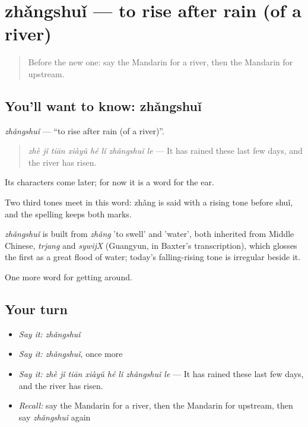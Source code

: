 \section[zhǎngshuǐ]{zhǎngshuǐ — to rise after rain (of a river)}

\label{lesson:ZH-C442-zhangshui}



\begin{quote}
Before the new one: say the Mandarin for a river, then the Mandarin for upstream.
\end{quote}

\subsection*{You'll want to know: zhǎngshuǐ}
\emph{zhǎngshuǐ} — \textquotedblleft{}to rise after rain (of a river)\textquotedblright{}.

\begin{quote}
\emph{zhè jǐ tiān xiàyǔ hé lǐ zhǎngshuǐ le} — It has rained these last few days, and the river has risen.
\end{quote}

Its characters come later; for now it is a word for the ear.

Two third tones meet in this word: zhǎng is said with a rising tone before shuǐ, and the spelling keeps both marks.

\begin{cousinweb}
\emph{zhǎngshuǐ} is built from \emph{zhǎng} 'to swell' and  'water', both inherited from Middle Chinese, \emph{trjang} and \emph{sywijX} (Guangyun, in Baxter's transcription), which glosses the first as a great flood of water; today's falling-rising tone is irregular beside it.
\end{cousinweb}

\begin{grammarlens}[title={What you've built}]
One more word for getting around.
\end{grammarlens}

\subsection*{Your turn}
\begin{itemize}
\raggedright
  \item \emph{Say it:} \emph{zhǎngshuǐ}
  \item \emph{Say it:} \emph{zhǎngshuǐ}, once more
  \item \emph{Say it:} \emph{zhè jǐ tiān xiàyǔ hé lǐ zhǎngshuǐ le} — It has rained these last few days, and the river has risen.
  \item \emph{Recall:} say the Mandarin for a river, then the Mandarin for upstream, then say \emph{zhǎngshuǐ} again
\end{itemize}

